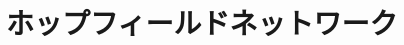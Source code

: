 \documentclass[../main.tex]{subfiles}
\begin{document}
\ifSubfilesClassLoaded{\setcounter{chapter}{6}}{}

\chapter{ホップフィールドネットワーク}
\end{document}
